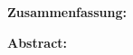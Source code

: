 \thispagestyle{empty}
\begin{center}
  \begin{minipage}[c][0.48\textheight][b]{\textwidth}
    \small
    \textbf{Zusammenfassung:}\par
    \vspace{\baselineskip}
    
  \end{minipage}\par
  \vfill
  \begin{minipage}[c][0.48\textheight][b]{\textwidth}
    \small
    \textbf{Abstract:}\par
    \vspace{\baselineskip}
    
  \end{minipage}
\end{center}
